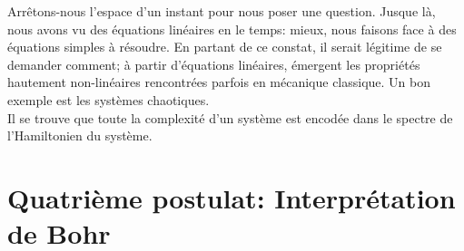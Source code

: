 \documentclass[../notesdecours.tex]{subfiles}
\begin{document}
    Arrêtons-nous l'espace d'un instant pour nous poser une question. Jusque là, nous avons vu des équations linéaires en le temps: mieux, nous faisons face à des équations simples à résoudre. En partant de ce constat, il serait légitime de se demander comment; à partir d'équations linéaires, émergent les propriétés hautement non-linéaires rencontrées parfois en mécanique classique. Un bon exemple est les systèmes chaotiques.\\

    Il se trouve que toute la complexité d'un système est encodée dans le spectre de l'Hamiltonien du système.

    \section{Quatrième postulat: Interprétation de Bohr}
\end{document}
